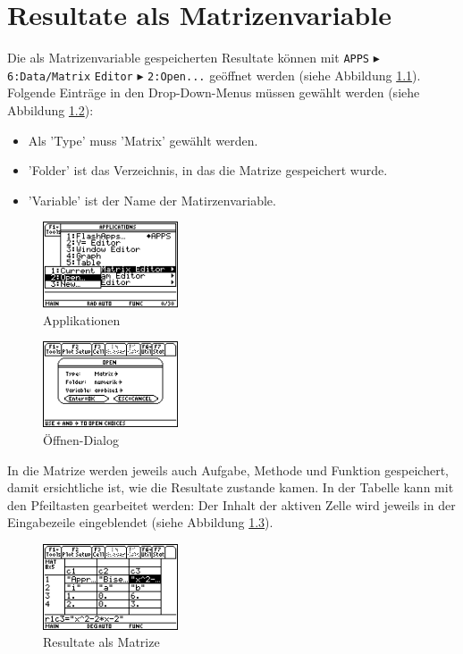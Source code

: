 \documentclass[a5paper,9pt]{scrreprt}
\begin{document}
\chapter{Resultate als Matrizenvariable}
Die als Matrizenvariable gespeicherten Resultate k\"onnen mit \verb|APPS| $\blacktriangleright$ \verb|6:Data/Matrix| \verb|Editor| $\blacktriangleright$ \verb|2:Open...| ge\"offnet werden (siehe Abbildung \ref{fig:Applications}). Folgende Eintr\"age in den Drop-Down-Menus m\"ussen gew\"ahlt werden (siehe Abbildung \ref{fig:Open}):
\begin{itemize}
  \item Als 'Type' muss 'Matrix' gew\"ahlt werden.
  \item 'Folder' ist das Verzeichnis, in das die Matrize gespeichert wurde.
  \item 'Variable' ist der Name der Matirzenvariable.
\end{itemize}
\begin{figure}[h]
  \centering
  \includegraphics[width=4cm]{img/nummeth_image050.png}
  \caption{Applikationen}
  \label{fig:Applications}
\end{figure}
\begin{figure}[h]
  \centering
  \includegraphics[width=4cm]{img/nummeth_image052.png}
  \caption{\"Offnen-Dialog}
  \label{fig:Open}
\end{figure}
In die Matrize werden jeweils auch Aufgabe, Methode und Funktion gespeichert, damit ersichtliche ist, wie die Resultate zustande kamen. In der Tabelle kann mit den Pfeiltasten gearbeitet werden: Der Inhalt der aktiven Zelle wird jeweils in der Eingabezeile eingeblendet (siehe Abbildung \ref{fig:Matrix}).
\begin{figure}[h]
  \centering
  \includegraphics[width=4cm]{img/nummeth_image054.png}
  \caption{Resultate als Matrize}
  \label{fig:Matrix}
\end{figure}
\end{document}
